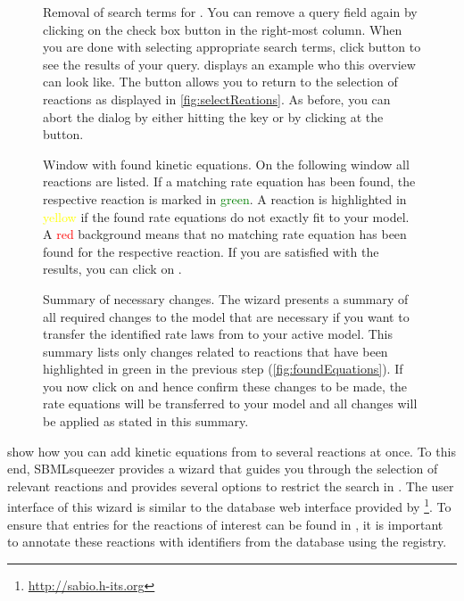 \begin{figure}[t!]
\caption[Removal of search terms for \SABIO]{Removal of search terms for \SABIO.
You can remove a query field again by clicking on the check box button in the right-most column.
When you are done with selecting appropriate search terms, click button  to see the results of your query.  displays an example who this overview can look like.
The  button allows you to return to the selection of reactions as displayed in \vref{fig:selectReations}.
As before, you can abort the dialog by either hitting the key \keys{\escwin} or by clicking at the  button.
}
\label{fig:removeSearchTerms}
\end{figure}
\begin{figure}[t!]
\caption[Window with found kinetic equations]{Window with found kinetic equations.
On the following window all reactions are listed.
If a matching rate equation has been found, the respective reaction is marked in \textcolor{green}{green}.
A reaction is highlighted in \textcolor{yellow}{yellow} if the found rate equations do not exactly fit to your model.
A \textcolor{red}{red} background means that no matching rate equation has been found for the respective reaction.
If you are satisfied with the results, you can click on .
}
\label{fig:foundEquations}
\end{figure}
\begin{figure}[t!]
\caption[Summary of necessary changes]{Summary of necessary changes.
The wizard presents a summary of all required changes to the model that are necessary if you want to transfer the identified rate laws from \SABIO to your active model.
This summary lists only changes related to reactions that have been highlighted in green in the previous step (\vref{fig:foundEquations}).
If you now click on  and hence confirm these changes to be made, the rate
equations will be transferred to your model and all changes will be applied as stated in this summary.}
\label{fig:changes}
\end{figure}
 show how you can add kinetic equations from \SABIO to several reactions at once.
To this end, SBMLsqueezer provides a wizard that guides you through the selection of relevant reactions and provides several options to restrict the search in \SABIO.
The user interface of this wizard is similar to the database web interface provided by \SABIO\footnote{\url{http://sabio.h-its.org}}.
To ensure that entries for the reactions of interest can be found in \SABIO, it is important to annotate these reactions with identifiers from the \KEGG database using the \MIRIAM registry.

